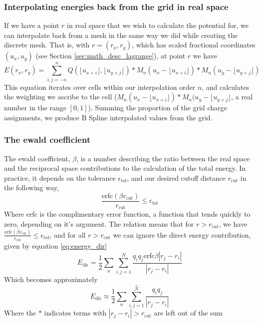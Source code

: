 \documentclass[pdftex,twoside,a4paper]{report}
\begin{document}
\subsubsection{Interpolating energies back from the grid in real space}
\label{sec:interpolate_from_grid}
If we have a point $r$ in real space that we wish to calculate the potential for, we can interpolate back from a mesh in the same way we did while creating the discrete mesh.
That is, with $r = (r_x,r_y)$, which has scaled fractional coordinates $(u_x,u_y)$ (see Section \ref{sec:math_desc_lagrange}), at point $r$ we have\\
\begin{equation}
\label{eq:interpoalte_from_grid}
E(r_x,r_y) = \sum _{i,j = -n} ^{n} Q(\lfloor u_{x+i} \rfloor,\lfloor u_{y+j} \rfloor) * M_n(u_x - \lfloor u_{x+i} \rfloor) * M_n(u_y - \lfloor u_{y+j} \rfloor)
\end{equation}
This equation iterates over cells within our interpolation order $n$, and calculates the weighting we ascribe to the cell ($ M_n(u_x - \lfloor u_{x+i} \rfloor) * M_n(u_y - \lfloor u_{y+j} \rfloor$, a real number in the range $[0,1]$). Summing the proportion of the grid charge assignments, we produce B Spline interpolated values from the grid.
\subsubsection{The ewald coefficient}
The ewald coefficient, $\beta$, is a number describing the ratio between the real space and the reciprocal space contributions to the calculation of the total energy. In practice, it depends on the tolerance $\epsilon_\text{tol}$, and our desired cutoff distance $r_{\text{cut}}$ in the following way, \cite{darden:10089} \cite{essmann:8577}\\
\begin{equation}
\frac{\text{erfc}(\beta r_{\text{cut}})}{r_\text{cut}} \leq \epsilon_\text{tol}
\label{eq:ewald_coeff}
\end{equation}
Where erfc is the complimentary error function, a function that tends quickly to zero, depending on it's argument. The relation means that for $r > r_{cut}$, we have $\frac{\text{erfc}(\beta r_{\text{cut}})}{r_\text{cut}} \leq \epsilon_\text{tol}$, and for all $r > r_\text{cut}$ we can ignore the direct energy contribution, given by equation \ref{eq:energy_dir} \cite{essmann:8577}\\
\begin{equation}
E_\text{dir} = \frac{1}{2} \sum_{n} \sum_{i,j = 1} ^N \frac{q_i q_j \text{erfc}{\beta |r_j - r_i|}}{|r_j - r_i|}
\label{eq:energy_dir}
\end{equation}
Which becomes approximately
\begin{equation}
E_\text{dir} \approx \frac{1}{2} \sum_{n} \sum_{i,j = 1} ^{\overset{*}{N}} \frac{q_i q_j}{|r_j - r_i|}
\label{eq:energy_dir_noerfc}
\end{equation}
Where the $*$ indicates terms with $|r_j - r_i| > r_{\text{cut}}$ are left out of the sum
\end{document}

